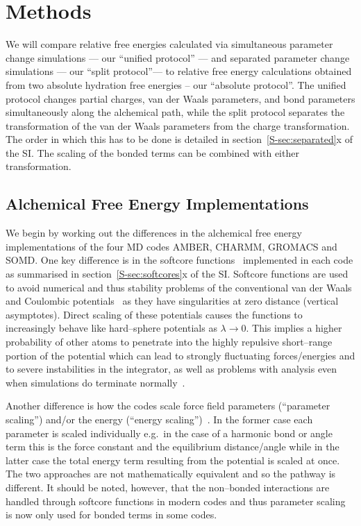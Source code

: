 \documentclass[journal=jctcce,manuscript=article]{achemso}
\begin{document}
\section{Methods}
\label{sec:methods}

We will compare relative free energies calculated via simultaneous parameter 
change simulations --- our ``unified protocol'' --- and separated parameter 
change simulations --- our ``split protocol''--- to relative free energy 
calculations obtained from two absolute hydration free energies -- our 
``absolute protocol''.  The unified protocol changes partial charges, van der Waals parameters, and bond parameters simultaneously along the alchemical path, while the split protocol separates the transformation of the van der Waals parameters from the charge transformation.  The order in which this has to be done is detailed in section~\ref{S-sec:separated}x of the SI.  The scaling of the bonded terms can be combined with either transformation.

\subsection{Alchemical Free Energy Implementations}
\label{sec:afe_impl}

We begin by working out the differences in the alchemical free energy
implementations of the four MD codes AMBER, CHARMM, GROMACS and
SOMD.  One key difference is in the softcore
functions~\cite{beutler_avoiding_1994, zacharias_separationshifted_1994} 
implemented in each code as summarised in section~\ref{S-sec:softcores}x of the 
SI.  Softcore functions are used to avoid numerical and thus
stability problems of the conventional van der Waals and Coulombic
potentials~\cite{steinbrecher_nonlinear_2007} as they have
singularities at zero distance (vertical asymptotes).  Direct scaling
of these potentials causes the functions to increasingly behave like
hard--sphere potentials as $\lambda\rightarrow 0$.  This implies a
higher probability of other atoms to penetrate into the highly
repulsive short--range portion of the potential which can lead to
strongly fluctuating forces/energies and to severe instabilities in
the integrator, as well as problems with analysis even when simulations do 
terminate 
normally~\cite{beutler_avoiding_1994, zacharias_separationshifted_1994, 
steinbrecher_nonlinear_2007}.

Another difference is how the codes scale force field parameters (``parameter 
scaling'') and/or the energy (``energy 
scaling'')~\cite{doi:10.1021/jp981628n}.  In the former case each parameter is 
scaled individually e.g.\ in the case of a harmonic bond or angle term
this is the force constant and the equilibrium distance/angle while in the 
latter case the total energy term resulting from the potential is scaled at 
once.  The two approaches are not mathematically equivalent and so the pathway 
is different.  It should be noted, however, that the non--bonded interactions 
are handled through softcore functions in modern codes and thus parameter 
scaling~\cite{doi:10.1021/j100056a020, JCROSS1986198} is now only used for 
bonded terms in some codes.
\end{document}
